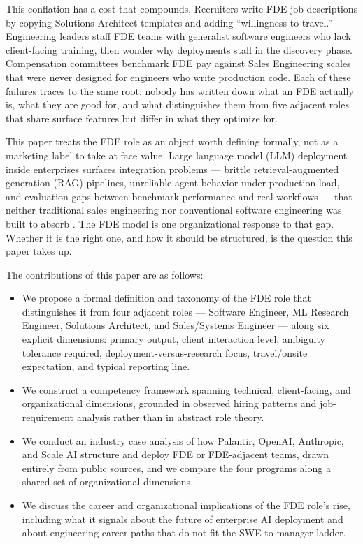 \documentclass[journal]{IEEEtran}
\begin{document}
This conflation has a cost that compounds. Recruiters write FDE job descriptions by copying Solutions Architect templates and adding ``willingness to travel.'' Engineering leaders staff FDE teams with generalist software engineers who lack client-facing training, then wonder why deployments stall in the discovery phase. Compensation committees benchmark FDE pay against Sales Engineering scales that were never designed for engineers who write production code. Each of these failures traces to the same root: nobody has written down what an FDE actually is, what they are good for, and what distinguishes them from five adjacent roles that share surface features but differ in what they optimize for.

This paper treats the FDE role as an object worth defining formally, not as a marketing label to take at face value. Large language model (LLM) deployment inside enterprises surfaces integration problems --- brittle retrieval-augmented generation (RAG) pipelines, unreliable agent behavior under production load, and evaluation gaps between benchmark performance and real workflows --- that neither traditional sales engineering nor conventional software engineering was built to absorb \cite{karakurt2026rag,mohammadi2025llmagentsurvey,wang2025llmagentdataanalysis,brehme2025ragtrust}. The FDE model is one organizational response to that gap. Whether it is the right one, and how it should be structured, is the question this paper takes up.

The contributions of this paper are as follows:
\begin{itemize}
  \item We propose a formal definition and taxonomy of the FDE role that distinguishes it from four adjacent roles --- Software Engineer, ML Research Engineer, Solutions Architect, and Sales/Systems Engineer --- along six explicit dimensions: primary output, client interaction level, ambiguity tolerance required, deployment-versus-research focus, travel/onsite expectation, and typical reporting line.
  \item We construct a competency framework spanning technical, client-facing, and organizational dimensions, grounded in observed hiring patterns and job-requirement analysis rather than in abstract role theory.
  \item We conduct an industry case analysis of how Palantir, OpenAI, Anthropic, and Scale AI structure and deploy FDE or FDE-adjacent teams, drawn entirely from public sources, and we compare the four programs along a shared set of organizational dimensions.
  \item We discuss the career and organizational implications of the FDE role's rise, including what it signals about the future of enterprise AI deployment and about engineering career paths that do not fit the SWE-to-manager ladder.
\end{itemize}
\end{document}

